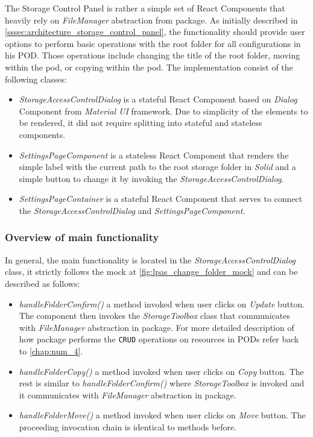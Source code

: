 The Storage Control Panel is rather a simple set of React Components that heavily rely on \textit{FileManager} abstraction from \lpas{} package. As initially described in \autoref{sssec:architecture_storage_control_panel}, the functionality should provide user options to perform basic operations with the root folder for all \lpa{} configurations in his \solid{} POD. Those operations include changing the title of the root folder, moving within the pod, or copying within the pod. The implementation consist of the following classes:
\begin{itemize}
    \item \textit{StorageAccessControlDialog} is a stateful React Component based on \textit{Dialog} Component from \textit{Material UI} framework. Due to simplicity of the elements to be rendered, it did not require splitting into stateful and stateless components.
    \item \textit{SettingsPageComponent} is a stateless React Component that renders the simple label with the current path to the root storage folder in \textit{Solid} and a simple button to change it by invoking the \textit{StorageAccessControlDialog}.
    \item \textit{SettingsPageContainer} is a stateful React Component that serves to connect the \textit{StorageAccessControlDialog} and \textit{SettingsPageComponent}.
\end{itemize}

\subsubsection{Overview of main functionality}

In general, the main functionality is located in the \textit{StorageAccessControlDialog} class, it strictly follows the mock at \autoref{fig:lpas_change_folder_mock} and can be described as follows:
\begin{itemize}
    \item \textit{handleFolderConfirm()} a method invoked when user clicks on \textit{Update} button. The component then invokes the \textit{StorageToolbox} class that communicates with \textit{FileManager} abstraction in \lpas{} package. For more detailed description of how \lpas{} package performs the \texttt{CRUD} operations on resources in \solid{} PODs refer back to \autoref{chap:num_4}.
    \item \textit{handleFolderCopy()} a method invoked when user clicks on \textit{Copy} button. The rest is similar to \textit{handleFolderConfirm()} where \textit{StorageToolbox} is invoked and it communicates with \textit{FileManager} abstraction in \lpas{} package. 
    \item \textit{handleFolderMove()} a method invoked when user clicks on \textit{Move} button. The proceeding invocation chain is identical to methods before.
\end{itemize}

